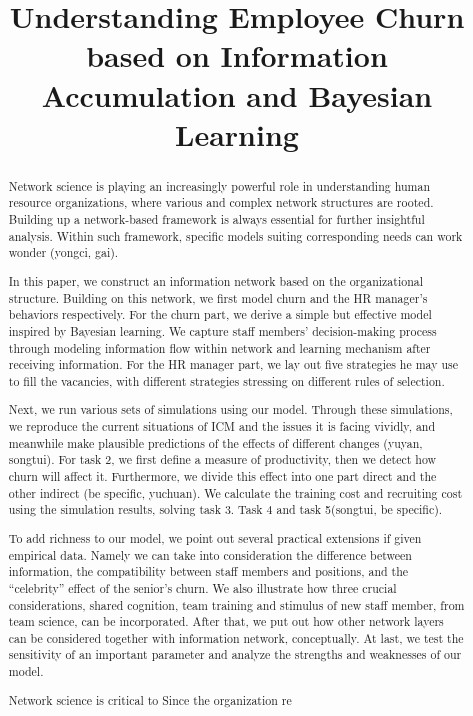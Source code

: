 \documentclass[tcn = 37075, sheet = false, abstract = false]{mcmthesis}
\title{Understanding Employee Churn based on Information Accumulation and Bayesian Learning}
\author{}
\date{}
\begin{document}
\maketitle
\begin{abstract}
Network science is playing an increasingly powerful role in understanding human resource organizations, where various and complex network structures are rooted. Building up a network-based framework is always essential for further insightful analysis. Within such framework, specific models suiting corresponding needs can work wonder (yongci, gai).

In this paper, we construct an information network based on the organizational structure. Building on this network, we first model churn and the HR manager’s behaviors respectively. For the churn part, we derive a simple but effective model inspired by Bayesian learning. We capture staff members’ decision-making process through modeling information flow within network and learning mechanism after receiving information. For the HR manager part, we lay out five strategies he may use to fill the vacancies, with different strategies stressing on different rules of selection.

Next, we run various sets of simulations using our model. Through these simulations, we reproduce the current situations of ICM and the issues it is facing vividly, and meanwhile make plausible predictions of the effects of different changes (yuyan, songtui). For task 2, we first define a measure of productivity, then we detect how churn will affect it. Furthermore, we divide this effect into one part direct and the other indirect (be specific, yuchuan). We calculate the training cost and recruiting cost using the simulation results, solving task 3. Task 4 and task 5(songtui, be specific). 

To add richness to our model, we point out several practical extensions if given empirical data. Namely we can take into consideration the difference between information, the compatibility between staff members and positions, and the “celebrity” effect of the senior’s churn. We also illustrate how three crucial considerations, shared cognition, team training and stimulus of new staff member, from team science, can be incorporated. After that, we put out how other network layers can be considered together with information network, conceptually. At last, we test the sensitivity of an important parameter and analyze the strengths and weaknesses of our model.

Network science is critical to 
Since the organization re


\end{abstract}
\end{document}
